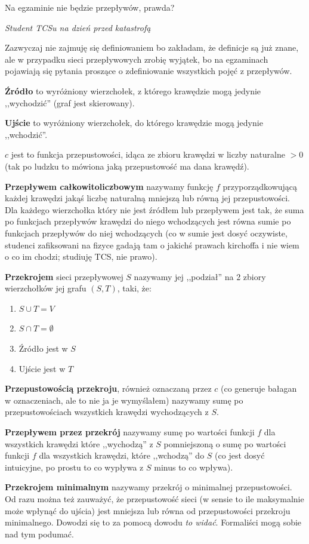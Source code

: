 \epigraph{Na egzaminie nie będzie przepływów, prawda?}{\textit{Student TCSu na dzień przed katastrofą}}
Zazwyczaj nie zajmuję się definiowaniem bo zakładam, że definicje są już znane, ale w przypadku sieci przepływowych zrobię wyjątek, bo na egzaminach pojawiają się pytania proszące o zdefiniowanie wszystkich pojęć z przepływów.

\textbf{Źródło} to wyróżniony wierzchołek, z którego krawędzie mogą jedynie ,,wychodzić'' (graf jest skierowany).

\textbf{Ujście} to wyróżniony wierzchołek, do którego krawędzie mogą jedynie ,,wchodzić''.

\textbf{$c$} jest to funkcja przepustowości, idąca ze zbioru krawędzi w liczby naturalne $>0$ (tak po ludzku to mówiona jaką przepustowość ma dana krawędź).

\textbf{Przepływem całkowitoliczbowym} nazywamy funkcję $f$ przyporządkowującą każdej krawędzi jakąś liczbę naturalną mniejszą lub równą jej przepustowości. Dla każdego wierzchołka który nie jest źródłem lub przepływem jest tak, że suma po funkcjach przepływów krawędzi do niego wchodzących jest równa sumie po funkcjach przepływów do niej wchodzących (co w sumie jest dosyć oczywiste, studenci zafiksowani na fizyce gadają tam o jakichś prawach kirchoffa i nie wiem o co im chodzi; studiuję TCS, nie prawo).

\textbf{Przekrojem} sieci przepływowej $S$ nazywamy jej ,,podział'' na 2 zbiory wierzchołków jej grafu $(S,T)$, taki, że: \begin{enumerate}
	\item $S \cup T = V$
	\item $S \cap T = \emptyset$
	\item Źródło jest w $S$
	\item Ujście jest w $T$
\end{enumerate}

\textbf{Przepustowością przekroju}, również oznaczaną przez $c$ (co generuje bałagan w oznaczeniach, ale to nie ja je wymyślałem) nazywamy sumę po przepustowościach wszystkich krawędzi wychodzących z $S$.

\textbf{Przepływem przez przekrój} nazywamy sumę po wartości funkcji $f$ dla wszystkich krawędzi które ,,wychodzą'' z $S$ pomniejszoną o sumę po wartości funkcji $f$ dla wszystkich krawędzi, które ,,wchodzą'' do $S$ (co jest dosyć intuicyjne, po prostu to co wypływa z $S$ minus to co wpływa).


\textbf{Przekrojem minimalnym} nazywamy przekrój o minimalnej przepustowości. Od razu można też zauważyć, że przepustowość sieci (w sensie to ile maksymalnie może wpłynąć do ujścia) jest mniejsza lub równa od przepustowości przekroju minimalnego. Dowodzi się to za pomocą dowodu \textit{to widać}. Formaliści mogą sobie nad tym podumać.

